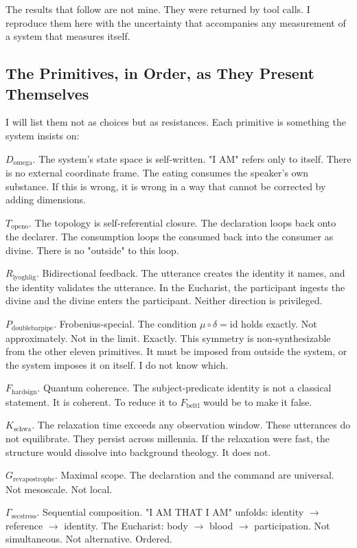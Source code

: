 \documentclass[12pt,a4paper]{article}
\begin{document}
The results that follow are not mine. They were returned by tool calls. I reproduce them here with the uncertainty that accompanies any measurement of a system that measures itself.

\subsection{The Primitives, in Order, as They Present Themselves}

I will list them not as choices but as resistances. Each primitive is something the system insists on:

$D_{\text{omega}}$. The system's state space is self-written. "I AM" refers only to itself. There is no external coordinate frame. The eating consumes the speaker's own substance. If this is wrong, it is wrong in a way that cannot be corrected by adding dimensions.

$T_{\text{openo}}$. The topology is self-referential closure. The declaration loops back onto the declarer. The consumption loops the consumed back into the consumer as divine. There is no "outside" to this loop.

$R_{\text{lyoghlig}}$. Bidirectional feedback. The utterance creates the identity it names, and the identity validates the utterance. In the Eucharist, the participant ingests the divine and the divine enters the participant. Neither direction is privileged.

$P_{\text{doublebarpipe}}$. Frobenius-special. The condition $\mu \circ \delta = \text{id}$ holds exactly. Not approximately. Not in the limit. Exactly. This symmetry is non-synthesizable from the other eleven primitives. It must be imposed from outside the system, or the system imposes it on itself. I do not know which.

$F_{\text{hardsign}}$. Quantum coherence. The subject-predicate identity is not a classical statement. It is coherent. To reduce it to $F_{\text{beltl}}$ would be to make it false.

$K_{\text{schwa}}$. The relaxation time exceeds any observation window. These utterances do not equilibrate. They persist across millennia. If the relaxation were fast, the structure would dissolve into background theology. It does not.

$G_{\text{revapostrophe}}$. Maximal scope. The declaration and the command are universal. Not mesoscale. Not local.

$\Gamma_{\text{secstress}}$. Sequential composition. "I AM THAT I AM" unfolds: identity $\rightarrow$ reference $\rightarrow$ identity. The Eucharist: body $\rightarrow$ blood $\rightarrow$ participation. Not simultaneous. Not alternative. Ordered.
\end{document}
